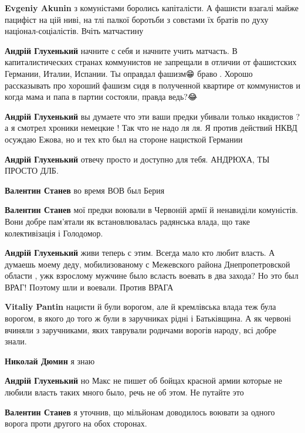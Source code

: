 \begin{itemize}
\begin{itemize}
\textbf{Evgeniy Akunin} з комуністами боролись капіталісти. А фашисти взагалі
майже пацифіст на цій ниві, на тлі палкої боротьби з совєтами їх братів по духу
націонал-соціалістів. Вчіть матчастину


\textbf{Андрій Глухенький} начните с себя и начните учить матчасть. В
капиталистических странах коммунистов не запрещали в отличии от фашистских
Германии, Италии, Испании. Ты оправдал фашизм😁 браво👏. Хорошо рассказывать
про хороший фашизм сидя в полученной квартире от коммунистов и когда мама и
папа в партии состояли, правда ведь?😂


\textbf{Андрій Глухенький} вы думаете что эти ваши предки убивали только
нквдистов ?а я смотрел хроники немецкие ! Так что не надо ля ля. Я против
действий НКВД осуждаю Ежова, но и тех кто был на стороне нацисткой Германии

\textbf{Андрій Глухенький} отвечу просто и доступно для тебя. АНДРЮХА, ТЫ ПРОСТО ДЛБ.

\textbf{Валентин Станев} во время ВОВ был Берия

\textbf{Валентин Станев} мої предки воювали в Червоній армії й ненавиділи
комуністів. Вони добре пам'ятали як встановлювалась радянська влада, що таке
колективізація і Голодомор.


\textbf{Андрій Глухенький} живи теперь с этим. Всегда мало кто любит власть. А
думаешь моему деду, мобилизованому с Межевского района Днепропетровской области
, ужк взрослому мужчине было всласть воевать в два захода? Но это был ВРАГ!
Поэтому шли и воевали. Против ВРАГА

\textbf{Vitaliy Pantin} нацисти й були ворогом, але й кремлівська влада теж
була ворогом, в якого до того ж були в заручниках рідні і Батьківщина. А як
червоні вчиняли з заручниками, яких таврували родичами ворогів народу, всі
добре знали.

\textbf{Николай Дюмин} я знаю

\textbf{Андрій Глухенький} но Макс не пишет об бойцах красной армии которые не
любили власть таких много было, речь не об этом. Не путайте это

\textbf{Валентин Станев} я уточнив, що мільйонам доводилось воювати за одного ворога проти другого на обох сторонах.


\end{itemize}
\end{itemize}
